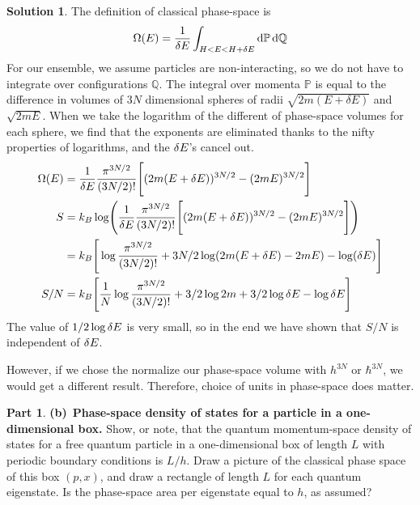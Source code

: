 \documentclass[11pt]{article}
\renewcommand{\d}[1]{\ensuremath{\operatorname{d}\!{#1}}}
\theoremstyle{definition}
\newtheorem{question}{Part}[section]
\newtheorem*{solution}{Solution}
\numberwithin{equation}{section}
\numberwithin{figure}{section}
\begin{document}
\begin{solution}
The definition of classical phase-space is
\begin{equation}
\Omega(E) = \frac{1}{\var E}\int_{H < E < H+ \var E } \d{\mathbb{P}} \d{\mathbb{Q}}
\end{equation}
For our ensemble, we assume particles are non-interacting, so we do not have to integrate over configurations $\mathbb{Q}$. The integral over momenta $\mathbb{P}$ is equal to the difference in volumes of $3N$ dimensional spheres of radii $\sqrt{2m(E + \delta E)}$ and $\sqrt{2mE}$. When we take the logarithm of the different of phase-space volumes for each sphere, we find that the exponents are eliminated thanks to the nifty properties of logarithms, and the $\var E$'s cancel out.
\begin{align}
\Omega(E) &= \frac{1}{\var E} \frac{\pi^{3N/2}}{(3N/2)!} \Bigg[ (2m(E + \delta E))^{3N/2} -  (2mE)^{3N/2}\Bigg]
\\
S &= k_B \log(\frac{1}{\var E} \frac{\pi^{3N/2}}{(3N/2)!} \Bigg[ (2m(E + \delta E))^{3N/2} -  (2mE)^{3N/2}\Bigg])
\\
&= k_B \Bigg[ \log{\frac{\pi^{3N/2}}{(3N/2)!}} + 3N/2\log( 2m(E + \var E) - 2mE) - \log(\var E)   \Bigg]
\\
S/N &= k_B \Bigg[ \frac{1}{N} \log{\frac{\pi^{3N/2}}{(3N/2)!}} + 3/2\log{2m} + 3/2\log{\var E} -\log{\var E}    \Bigg]
\end{align}
The value of $1/2 \log{\var E}$ is very small, so in the end we have shown that $S/N$ is independent of $\var E$.

However, if we chose the normalize our phase-space volume with $h^{3N}$ or $\hbar^{3N}$, we would get a different result. Therefore, choice of units in phase-space does matter.
\end{solution}



\begin{question}
\textbf{(b)}~\textbf{Phase-space density of states for a  particle in a one-dimensional box.} Show, or note, that the quantum momentum-space density of states for a free quantum particle in a one-dimensional box of length $L$ with periodic boundary conditions is $L/h$. Draw a picture of the classical phase space of this box $(p,x)$, and draw a rectangle of length $L$ for each quantum eigenstate. Is the phase-space area per eigenstate equal to $h$, as assumed?
\end{question}
\end{document}
